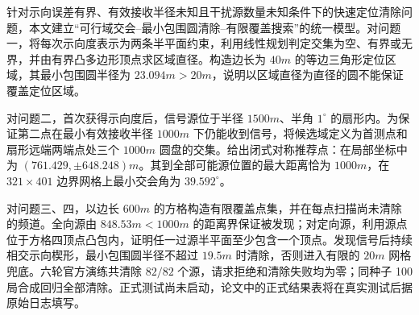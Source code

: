 针对示向误差有界、有效接收半径未知且干扰源数量未知条件下的快速定位清除问题，本文建立“可行域交会--最小包围圆清除--有限覆盖搜索”的统一模型。对问题一，将每次示向度表示为两条半平面约束，利用线性规划判定交集为空、有界或无界，并由有界凸多边形顶点求区域直径。构造边长为 $40\unit{m}$ 的等边三角形定位区域，其最小包围圆半径为 $23.094\unit{m}>20\unit{m}$，说明以区域直径为直径的圆不能保证覆盖定位区域。

对问题二，首次获得示向度后，信号源位于半径 $1500\unit{m}$、半角 $1^\circ$ 的扇形内。为保证第二点在最小有效接收半径 $1000\unit{m}$ 下仍能收到信号，将候选域定义为首测点和扇形远端两端点处三个 $1000\unit{m}$ 圆盘的交集。给出闭式对称推荐点：在局部坐标中为 $(761.429,\pm648.248)\unit{m}$。其到全部可能源位置的最大距离恰为 $1000\unit{m}$，在 $321\times401$ 边界网格上最小交会角为 $39.592^\circ$。

对问题三、四，以边长 $600\unit{m}$ 的方格构造有限覆盖点集，并在每点扫描尚未清除的频道。全向源由 $848.53\unit{m}<1000\unit{m}$ 的距离界保证被发现；对定向源，利用源点位于方格四顶点凸包内，证明任一过源半平面至少包含一个顶点。发现信号后持续相交示向楔形，最小包围圆半径不超过 $19.5\unit{m}$ 时清除，否则进入有限的 $20\unit{m}$ 网格兜底。六轮官方演练共清除 $82/82$ 个源，请求拒绝和清除失败均为零；同种子 100 局合成回归全部清除。正式测试尚未启动，论文中的正式结果表将在真实测试后据原始日志填写。

